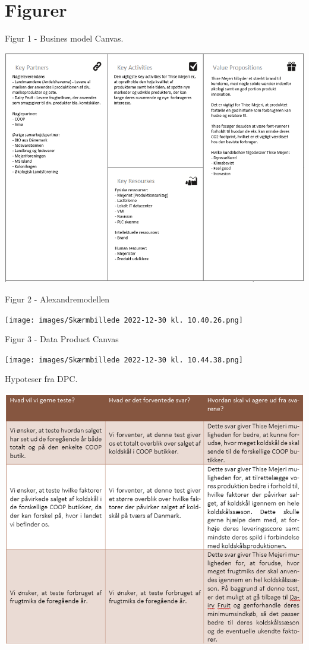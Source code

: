 \documentclass[
  12pt,
  a4paper,
  DIV=11,
  numbers=noendperiod]{scrartcl}
\begin{document}
\hypertarget{figurer}{%
\section{Figurer}\label{figurer}}

Figur 1 - Busines model Canvas.

\includegraphics{images/image-1487588843.png}

Figur 2 - Alexandremodellen

\texttt{[image: images/Skærmbillede 2022-12-30 kl. 10.40.26.png]}

Figur 3 - Data Product Canvas

\texttt{[image: images/Skærmbillede 2022-12-30 kl. 10.44.38.png]}

Hypoteser fra DPC.

\includegraphics{images/image-198045253.png}
\end{document}
